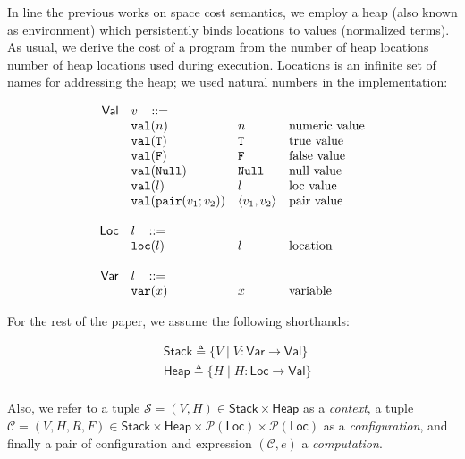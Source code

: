 \documentclass{easychair}
\newcommand{\ms}[1]{\ensuremath{\mathsf{#1}}}
\newcommand{\irl}[1]{\mathtt{#1}}
\theoremstyle{definition}
\begin{document}
In line the previous works on space cost semantics, we employ a heap (also known as 
environment) which persistently binds locations to values (normalized terms).
As usual, we derive the cost of a program from the number of heap locations 
number of heap locations used during execution. Locations is an infinite set of names for addressing
the heap; we used natural numbers in the implementation:

	\[
\begin{array}{r l l l l}
\ms{Val}
        & v   \,\,\,\,\, ::= \\
 	& \irl{val}(n)                                			& n 												& \text{numeric value}\\
 	& \irl{val}(\irl{T})                               			& \irl{T} 								  & \text{true value}\\
 	& \irl{val}(\irl{F})                                			& \irl{F}								  & \text{false value}\\
 	& \irl{val}(\irl{Null})                                  & \irl{Null} 								  & \text{null value}\\
 	& \irl{val}(l)                                			& l 								  & \text{loc value}\\
 	& \irl{val}(\pairexabt{v_1}{v_2})                             & \pairexcst{v_1}{v_2} 								  & \text{pair value}\\
  \\
\ms{Loc} & l   \,\,\,\,\, ::= \\
 	& \irl{loc}(l)                                			& l 												& \text{location}\\\\
\ms{Var} & l   \,\,\,\,\, ::= \\
 	& \irl{var}(x)                                			& x 												& \text{variable}
\end{array}
\]

For the rest of the paper, we assume the following shorthands:

\begin{align*}
	&\ms{Stack} \triangleq \{ V \mid V : \ms{Var} \to \ms{Val} \}\\
	&\ms{Heap} \triangleq \{ H \mid H: \ms{Loc} \to \ms{Val} \}\\
\end{align*}

Also, we refer to a tuple $\mathcal{S} = (V,H) \in \ms{Stack} \times \ms{Heap}$ as a \emph{context},
a tuple $\mathcal{C} = (V,H,R,F) \in \ms{Stack} \times \ms{Heap} \times \mathcal{P}(\ms{Loc})
\times \mathcal{P}(\ms{Loc})$ as a \emph{configuration}, and finally a pair of configuration and 
expression $(\mathcal{C}, e)$ a \emph{computation}.
\end{document}

